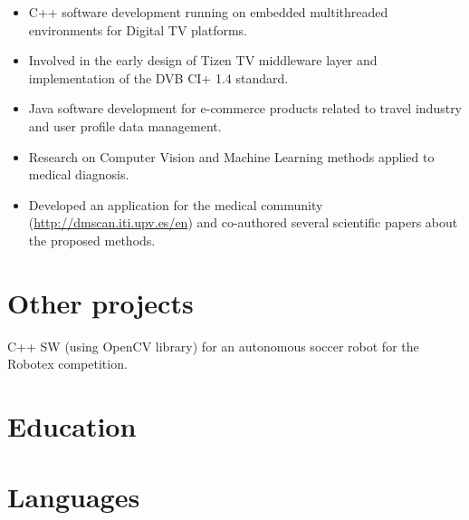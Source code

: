 \documentclass[11pt,a4paper,sans]{moderncv}
\begin{document}
{
  \begin{itemize}
  \item C++ software development running on embedded multithreaded environments for Digital TV platforms.
  \item Involved in the early design of Tizen TV middleware layer and implementation of the DVB CI+ 1.4 standard.
  \end{itemize}
}

{
  \begin{itemize}
  \item Java software development for e-commerce products related to travel industry and user profile data management.
  \end{itemize}
}

{ \begin{itemize}
  \item Research on Computer Vision and Machine Learning methods applied to medical diagnosis.
  \item Developed an application for the medical community (\url{http://dmscan.iti.upv.es/en}) and co-authored several scientific papers about the proposed methods.
\end{itemize} }

\section{Other projects}
{
  C++ SW (using OpenCV library) for an autonomous soccer robot for the Robotex competition.
}

\section{Education}

\section{Languages}
\begin{multicols}{3}
\end{multicols}

\renewcommand{\listitemsymbol}{-~}            %
\end{document}
